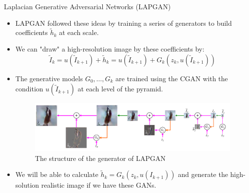 \documentclass[10pt]{beamer}
\begin{document}
	\begin{frame}{Laplacian Generative Adversarial Networks (LAPGAN)}
		\begin{itemize}
			\item LAPGAN followed these ideas by training a series of generators to build coefficients $\tilde{h}_k$ at each scale.
			\item We can "draw" a high-resolution image by these coefficients by:
			$$
			\tilde{I}_k=u(\tilde{I}_{k+1})+\tilde{h}_k=u(\tilde{I}_{k+1})+G_k(z_k,u(\tilde{I}_{k+1}))
			$$
			\item The generative models ${G_0,\dots,G_k}$ are trained using the CGAN with the condition $u(\tilde{I}_{k+1})$ at each level of the pyramid.
			\begin{figure}
				\includegraphics[width=30em]{figures/LAPGAN-generator-structure.png}
				\caption{The structure of the generator of LAPGAN}
			\end{figure}
			\item We will be able to calculate $\tilde{h}_k=G_k(z_k,u(I_{k+1}))$ and generate the high-solution realistic image if we have these GANs.
		\end{itemize}
	\end{frame}
\end{document}
